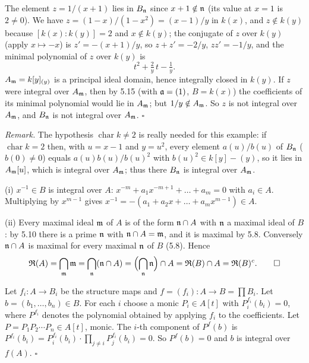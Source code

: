\documentclass[11pt]{article}
\begin{document}
The element $z=1/(x+1)$ lies in $B_\mathfrak n$ since $x+1\notin\mathfrak n$ (its value at $x=1$ is $2\ne0$). We have $z=(1-x)/(1-x^2)=(x-1)/y$ in $k(x)$, and $z\notin k(y)$ because $[k(x):k(y)]=2$ and $x\notin k(y)$; the conjugate of $z$ over $k(y)$ (apply $x\mapsto-x$) is $z'=-(x+1)/y$, so $z+z'=-2/y$, $zz'=-1/y$, and the minimal polynomial of $z$ over $k(y)$ is
\[
t^2+\tfrac2y\,t-\tfrac1y .
\]
$A_\mathfrak m=k[y]_{(y)}$ is a principal ideal domain, hence integrally closed in $k(y)$. If $z$ were integral over $A_\mathfrak m$, then by 5.15 (with $\mathfrak a=(1)$, $B=k(x)$) the coefficients of its minimal polynomial would lie in $A_\mathfrak m$; but $1/y\notin A_\mathfrak m$. So $z$ is not integral over $A_\mathfrak m$, and $B_\mathfrak n$ is not integral over $A_\mathfrak m$. \hfill$\square$

\emph{Remark.} The hypothesis $\operatorname{char}k\ne2$ is really needed for this example: if $\operatorname{char}k=2$ then, with $u=x-1$ and $y=u^2$, every element $a(u)/b(u)$ of $B_\mathfrak n$ ($b(0)\ne0$) equals $a(u)b(u)/b(u)^2$ with $b(u)^2\in k[y]-(y)$, so it lies in $A_\mathfrak m[u]$, which is integral over $A_\mathfrak m$; thus there $B_\mathfrak n$ is integral over $A_\mathfrak m$.

\pf
(i) $x^{-1}\in B$ is integral over $A$: $x^{-m}+a_1x^{-m+1}+\dots+a_m=0$ with $a_i\in A$. Multiplying by $x^{m-1}$ gives $x^{-1}=-(a_1+a_2x+\dots+a_mx^{m-1})\in A$.

(ii) Every maximal ideal $\mathfrak m$ of $A$ is of the form $\mathfrak n\cap A$ with $\mathfrak n$ a maximal ideal of $B$: by 5.10 there is a prime $\mathfrak n$ with $\mathfrak n\cap A=\mathfrak m$, and it is maximal by 5.8. Conversely $\mathfrak n\cap A$ is maximal for every maximal $\mathfrak n$ of $B$ (5.8). Hence
\[
\mathfrak R(A)=\bigcap_{\mathfrak m}\mathfrak m=\bigcap_{\mathfrak n}(\mathfrak n\cap A)=\Bigl(\bigcap_{\mathfrak n}\mathfrak n\Bigr)\cap A=\mathfrak R(B)\cap A=\mathfrak R(B)^c. \qquad\square
\]

\pf
Let $f_i:A\to B_i$ be the structure maps and $f=(f_i):A\to B=\prod B_i$. Let $b=(b_1,\dots,b_n)\in B$. For each $i$ choose a monic $P_i\in A[t]$ with $P_i^{f_i}(b_i)=0$, where $P^{f_i}$ denotes the polynomial obtained by applying $f_i$ to the coefficients. Let $P=P_1P_2\cdots P_n\in A[t]$, monic. The $i$-th component of $P^f(b)$ is $P^{f_i}(b_i)=P_i^{f_i}(b_i)\cdot\prod_{j\ne i}P_j^{f_i}(b_i)=0$. So $P^f(b)=0$ and $b$ is integral over $f(A)$. \hfill$\square$
\end{document}
